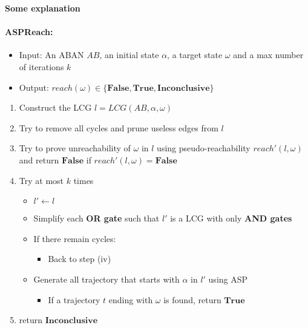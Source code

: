 \textbf{Some explanation}
\paragraph{{\bf ASPReach}:}

\begin{itemize}
    \item Input: An ABAN $AB$, an initial state $\alpha$, a target state $\omega$ and a max number of iterations $k$
    \item Output: $reach(\omega)\in\{\mathbf{False},\mathbf{True},\mathbf{Inconclusive}\}$
\end{itemize}
\begin{enumerate}
    \item Construct the LCG $l=LCG(AB,\alpha,\omega)$
    \item Try to remove all cycles and prune useless edges from $l$
    \item Try to prove unreachability of $\omega$ in $l$ using pseudo-reachability $reach'(l,\omega)$ and return $\mathbf{False}$ if $reach'(l,\omega)=\textbf{False}$
    \item Try at most $k$ times
    \begin{itemize}
    \item $l'\gets l$
    \item Simplify each \textbf{OR gate} such that $l'$ is a LCG with only \textbf{AND gates}
    \item If there remain cycles:
        \begin{itemize}
            \item Back to step (iv)
        \end{itemize}
    \item Generate all trajectory that starts with $\alpha$ in $l'$ using ASP
    \begin{itemize}
        \item If a trajectory $t$ ending with $\omega$ is found, return $\mathbf{True}$
    \end{itemize}
    \end{itemize}
    \item return $\mathbf{Inconclusive}$
\end{enumerate}

